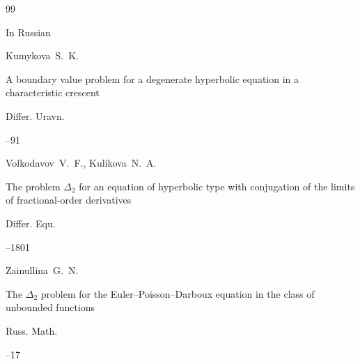 \begin{thebibliography}{99}





\lang In Russian

\by Kumykova~S.~K.

\paper A boundary value problem for a degenerate hyperbolic equation in a characteristic crescent

\jour Differ. Uravn.




--91









\by Volkodavov~V.~F., Kulikova~N.~A.

\paper The problem $\Delta_2$ for an equation of hyperbolic type with conjugation of the limits of fractional-order derivatives

\jour  Differ. Equ.




–1801







\by Zainullina~G.~N.

\paper The $\Delta_2$ problem for the Euler--Poisson--Darboux equation in the class of unbounded functions


\jour Russ. Math. 



--17 



\end{thebibliography}
